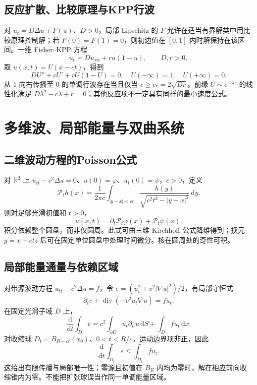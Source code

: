 \documentclass[../main.tex]{subfiles}
\begin{document}
\subsection{反应扩散、比较原理与KPP行波}
对 $u_t=D\Delta u+F(u)$、$D>0$，局部 Lipschitz 的 $F$ 允许在适当有界解类中用比较原理控制解；若 $F(0)=F(1)=0$，则初边值在 $[0,1]$ 内时解保持在该区间。一维 Fisher--KPP 方程
\[
u_t=Du_{xx}+r u(1-u),\qquad D,r>0,
\]
取 $u(x,t)=U(x-ct)$，得到
\[
DU''+cU'+rU(1-U)=0,\quad U(-\infty)=1,\quad U(+\infty)=0.
\]
从 $1$ 向右传播至 $0$ 的单调行波存在当且仅当 $c\ge c_*=2\sqrt{Dr}$。前缘 $U\sim e^{-\lambda z}$ 的线性化满足 $D\lambda^2-c\lambda+r=0$；其他反应项不一定具有同样的最小速度公式。

\section{多维波、局部能量与双曲系统}
\subsection{二维波动方程的Poisson公式}
对 $\mathbb R^2$ 上 $u_{tt}-c^2\Delta u=0$、$u(0)=\varphi$、$u_t(0)=\psi$，$c>0$，定义
\[
\mathcal P_t h(x)=\frac1{2\pi c}\int_{|y-x|<ct}
\frac{h(y)}{\sqrt{c^2t^2-|y-x|^2}}\,\mathrm dy.
\]
则对足够光滑初值和 $t>0$，
\[
u(x,t)=\partial_t\mathcal P_t\varphi(x)+\mathcal P_t\psi(x).
\]
积分依赖整个圆盘，而非仅圆周。此式可由三维 Kirchhoff 公式降维得到；换元 $y=x+ctz$ 后可在固定单位圆盘中处理时间微分。核在圆周处的奇性可积。
\subsection{局部能量通量与依赖区域}
对带源波动方程 $u_{tt}-c^2\Delta u=f$，令 $e=(u_t^2+c^2|\nabla u|^2)/2$，有局部守恒式
\[
\partial_te+\operatorname{div}(-c^2u_t\nabla u)=fu_t.
\]
在固定光滑子域 $D$ 上，
\[
\frac{\mathrm d}{\mathrm dt}\int_De
=c^2\int_{\partial D}u_t\partial_nu\,\mathrm dS+\int_Dfu_t\,\mathrm dx.
\]
对收缩球 $D_t=B_{R-ct}(x_0)$、$0<t<R/c$，运动边界项非正，因此
\[
\frac{\mathrm d}{\mathrm dt}\int_{D_t}e\le\int_{D_t}fu_t.
\]
这给出有限传播与局部唯一性；零源且初值在 $B_R$ 内均为零时，解在相应前向收缩锥内为零。不能把扩张球误当作同一单调能量区域。
\end{document}

